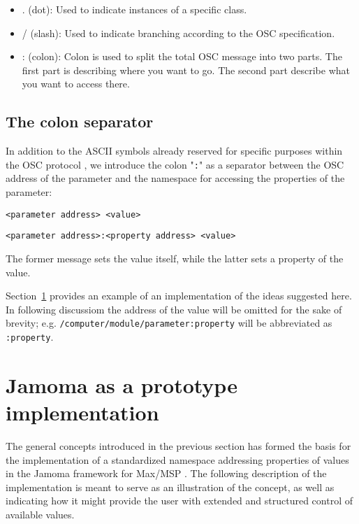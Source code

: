 \documentclass{sig-alternate}
\begin{document}
\begin{itemize}

	\item. (dot): Used to indicate instances of a specific class.
	\item / (slash): Used to indicate branching according to the OSC specification.
	\item : (colon): Colon is used to split the total OSC message into two parts. The first part is describing where you want to go. The second part describe what you want to access there.
\end{itemize}





\subsection{The colon separator} %
\label{sub:the_colon_separator}

In addition to the ASCII symbols already reserved for specific purposes within the OSC protocol \cite{Wright:1997}, we introduce the colon "\texttt{:}" as a separator between the OSC address of the parameter and the namespace for accessing the properties of the parameter:

\texttt{<parameter address> <value>}

\texttt{<parameter address>:<property address> <value>}

The former message sets the value itself, while the latter sets a property of the value. 

Section~\ref{sec:prototype_implementation} provides an example of an implementation of the ideas suggested here. In following discussiom the address of the value will be omitted for the sake of brevity; e.g. \texttt{/computer/module/parameter:property} will be abbreviated as \texttt{:property}.





\section{Jamoma as a prototype implementation} %
\label{sec:prototype_implementation}

The general concepts introduced in the previous section has formed the basis for the implementation of a standardized namespace addressing properties of values in the Jamoma framework for Max/MSP \cite{Place:2006}. The following description of the implementation is meant to serve as an illustration of the concept, as well as indicating how it might provide the user with extended and structured control of available values.
\end{document}
